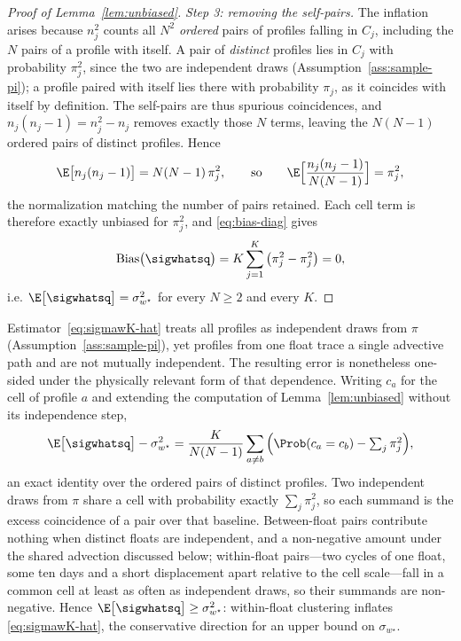 {\begin{proof}[Proof of Lemma~\ref{lem:unbiased}]
\emph{Step 3: removing the self-pairs.} The inflation arises because
$n_j^2$ counts all $N^2$ \emph{ordered} pairs of profiles falling in
$C_j$, including the $N$ pairs of a profile with itself. A pair of
\emph{distinct} profiles lies in $C_j$ with probability $\pi_j^2$, since
the two are independent draws (Assumption~\ref{ass:sample-pi}); a
profile paired with itself lies there with probability $\pi_j$, as it
coincides with itself by definition. The self-pairs are thus spurious
coincidences, and $n_j(n_j-1)=n_j^2-n_j$ removes exactly those $N$
terms, leaving the $N(N-1)$ ordered pairs of distinct profiles. Hence
\[
  \E\big[n_j(n_j-1)\big]=N(N-1)\,\pi_j^2 ,
  \qquad\text{so}\qquad
  \E\Big[\frac{n_j(n_j-1)}{N(N-1)}\Big]=\pi_j^2 ,
\]
the normalization matching the number of pairs retained. Each cell term
is therefore exactly unbiased for $\pi_j^2$, and \eqref{eq:bias-diag}
gives
\[
  \mathrm{Bias}\big(\sigwhatsq\big)
  =K\sum_{j=1}^{K}\big(\pi_j^2-\pi_j^2\big)=0 ,
\]
i.e. $\E\big[\sigwhatsq\big]=\sigma_{w^{\star}}^2$
for every $N\ge2$ and every $K$.
\end{proof}%
}


\begin{remark}
\label{rem:trajectory}
Estimator~\eqref{eq:sigmawK-hat} treats all profiles as independent draws
from $\pi$ (Assumption~\ref{ass:sample-pi}), yet profiles from one float
trace a single advective path and are not mutually independent. The
resulting error is nonetheless one-sided under the physically relevant
form of that dependence. Writing $c_a$ for the cell of profile $a$ and
extending the computation of Lemma~\ref{lem:unbiased} without its
independence step,
\begin{equation}
  \E\big[\sigwhatsq\big]-\sigma_{w^{\star}}^2
  =\frac{K}{N(N-1)}\sum_{a\ne b}
     \Big(\Prob(c_a=c_b)-\textstyle\sum_j\pi_j^2\Big),
  \label{eq:diag-bias-identity}
\end{equation}
an exact identity over the ordered pairs of distinct profiles. Two
independent draws from $\pi$ share a cell with probability exactly
$\sum_j\pi_j^2$, so each summand is the excess coincidence of a pair over
that baseline. Between-float pairs contribute nothing when distinct floats
are independent, and a non-negative amount under the shared advection
discussed below; within-float pairs---two cycles of one float, some ten
days and a short displacement apart relative to the cell scale---fall in a
common cell at least as often as independent draws, so their summands are
non-negative. Hence $\E\big[\sigwhatsq\big]\ge\sigma_{w^{\star}}^2$:
within-float clustering inflates \eqref{eq:sigmawK-hat}, the conservative
direction for an upper bound on $\sigma_{w^{\star}}$.
\end{remark}

